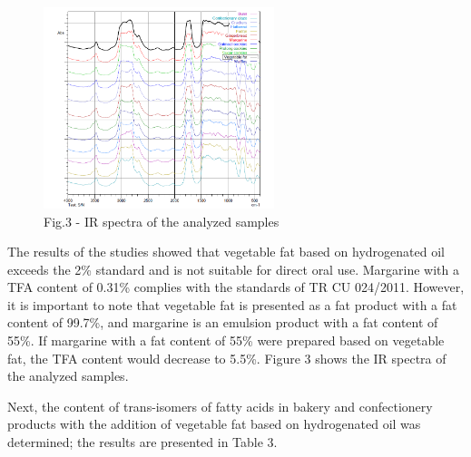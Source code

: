 \begin{figure}[H]
	\centering
	\includegraphics[width=0.6\textwidth]{media/pish/image12}
	\caption*{Fig.3 - IR spectra of the analyzed samples}
\end{figure}

\begin{multicols}{2}
The results of the studies showed that vegetable fat based on
hydrogenated oil exceeds the 2\% standard and is not suitable for direct
oral use. Margarine with a TFA content of 0.31\% complies with the
standards of TR CU 024/2011. However, it is important to note that
vegetable fat is presented as a fat product with a fat content of
99.7\%, and margarine is an emulsion product with a fat content of 55\%.
If margarine with a fat content of 55\% were prepared based on vegetable
fat, the TFA content would decrease to 5.5\%. Figure 3 shows the IR
spectra of the analyzed samples.

Next, the content of trans-isomers of fatty acids in bakery and
confectionery products with the addition of vegetable fat based on
hydrogenated oil was determined; the results are presented in Table 3.
\end{multicols}

